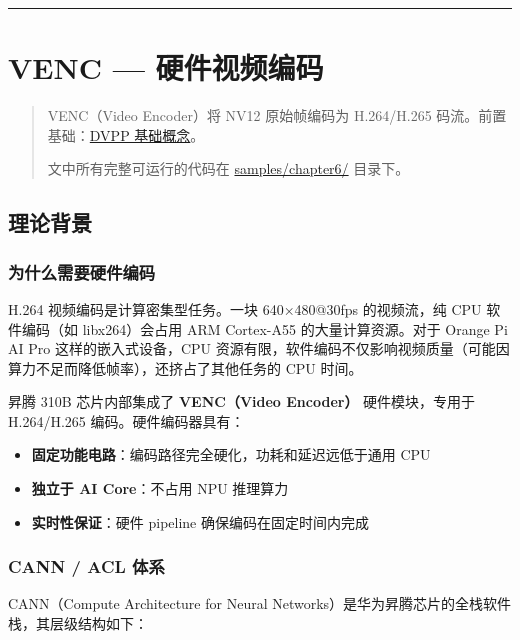 \begin{center}\rule{0.5\linewidth}{0.5pt}\end{center}

\section{VENC --- 硬件视频编码}\label{venc}

\begin{quote}
VENC（Video Encoder）将 NV12 原始帧编码为 H.264/H.265
码流。前置基础：\hyperref[dvpp-basics]{DVPP 基础概念}。

文中所有完整可运行的代码在
\href{https://github.com/zhouxzh/Ascend310/tree/master/samples/chapter6/}{samples/chapter6/}
目录下。
\end{quote}

\subsection{理论背景}\label{src-book-chapter6-h9}

\subsubsection{为什么需要硬件编码}\label{src-book-chapter6-h10}

H.264 视频编码是计算密集型任务。一块 640×480@30fps 的视频流，纯 CPU
软件编码（如 libx264）会占用 ARM Cortex-A55 的大量计算资源。对于 Orange
Pi AI Pro 这样的嵌入式设备，CPU
资源有限，软件编码不仅影响视频质量（可能因算力不足而降低帧率），还挤占了其他任务的
CPU 时间。

昇腾 310B 芯片内部集成了 \textbf{VENC（Video Encoder）} 硬件模块，专用于
H.264/H.265 编码。硬件编码器具有：

\begin{itemize}
\tightlist
\item
  \textbf{固定功能电路}：编码路径完全硬化，功耗和延迟远低于通用 CPU
\item
  \textbf{独立于 AI Core}：不占用 NPU 推理算力
\item
  \textbf{实时性保证}：硬件 pipeline 确保编码在固定时间内完成
\end{itemize}

\subsubsection{CANN / ACL 体系}\label{src-book-chapter6-h11}

CANN（Compute Architecture for Neural
Networks）是华为昇腾芯片的全栈软件栈，其层级结构如下：

